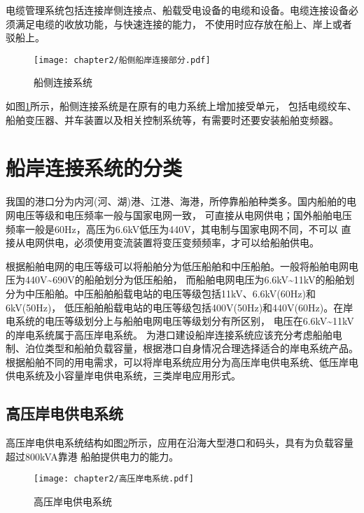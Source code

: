 电缆管理系统包括连接岸侧连接点、船载受电设备的电缆和设备。电缆连接设备必须满足电缆的收放功能，与快速连接的能力，
不使用时应存放在船上、岸上或者驳船上。

\begin{figure}[!htp]
	\centering
	\texttt{[image: chapter2/船侧船岸连接部分.pdf]}
	\caption{船侧连接系统}
	\label{fig:船侧连接系统}
\end{figure}

如图\ref{fig:船侧连接系统}所示\cite{SP15}，船侧连接系统是在原有的电力系统上增加接受单元，
包括电缆绞车、船舶变压器、并车装置以及相关控制系统等，有需要时还要安装船舶变频器。

\section{船岸连接系统的分类}

我国的港口分为内河(河、湖)港、江港、海港，所停靠船舶种类多。国内船舶的电网电压等级和电压频率一般与国家电网一致，
可直接从电网供电\cite{SP16}；国外船舶电压频率一般是60Hz，高压为6.6kV低压为440V，其电制与国家电网不同，不可以
直接从电网供电，必须使用变流装置将变压变频频率，才可以给船舶供电。

根据船舶电网的电压等级可以将船舶分为低压船舶和中压船舶。一般将船舶电网电压为440V\~{}690V的船舶划分为低压船舶，
而船舶电网电压为6.6kV\~{}11kV的船舶划分为中压船舶。中压船舶船载电站的电压等级包括11kV、6.6kV(60Hz)和6kV(50Hz)，
低压船舶船载电站的电压等级包括400V(50Hz)和440V(60Hz)\cite{SP15}。在岸电系统的电压等级划分上与船舶电网电压等级划分有所区别，
电压在6.6kV\~{}11kV的岸电系统属于高压岸电系统。
为港口建设船岸连接系统应该充分考虑船舶电制、泊位类型和船舶负载容量，根据港口自身情况合理选择适合的岸电系统产品。
根据船舶不同的用电需求，可以将岸电系统应用分为高压岸电供电系统、低压岸电供电系统及小容量岸电供电系统，三类岸电应用形式。

\subsection{高压岸电供电系统}

高压岸电供电系统结构如图\ref{fig:高压岸电供电系统}所示，应用在沿海大型港口和码头，具有为负载容量超过800kVA靠港
船舶提供电力的能力\cite{SP16}。

\begin{figure}[!htp]
	\centering
	\texttt{[image: chapter2/高压岸电系统.pdf]}
	\caption{高压岸电供电系统}
	\label{fig:高压岸电供电系统}
\end{figure}

